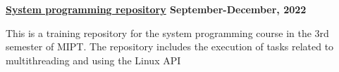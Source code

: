 \textbf{\href{https://github.com/jirol9xa/CompTech-2year/tree/master} {System programming repository} \hfill  September-December, 2022} \par
\begin{itemize}
This is a training repository for the system programming course in the 3rd semester of MIPT. The repository includes the execution of tasks related to multithreading and using the Linux API
\end{itemize} \par